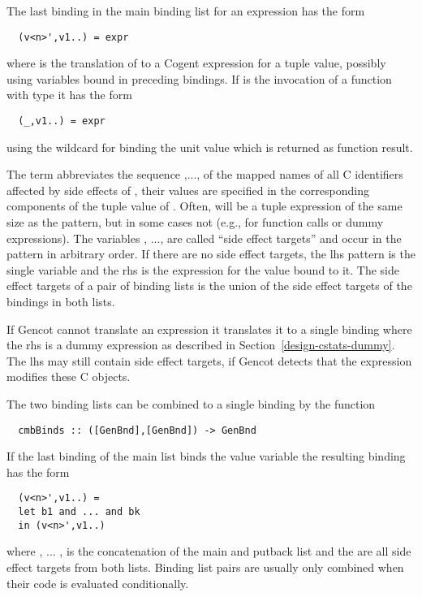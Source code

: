 The last binding in the main binding list for an expression  has the form
\begin{verbatim}
  (v<n>',v1..) = expr
\end{verbatim}
where  is the translation of  to a Cogent expression for a tuple value, possibly using variables bound 
in preceding bindings. If  is the invocation of a function with type  it has the form
\begin{verbatim}
  (_,v1..) = expr
\end{verbatim}
using the wildcard \code{\_} for binding the unit value which is returned as function result.

The term  abbreviates 
the sequence ,..., of the mapped names of all C identifiers affected by side effects of , their values 
are specified in the corresponding components of the tuple value of . Often,  will be a tuple 
expression of the same size as the pattern, but in some cases not (e.g., for function calls or dummy expressions). 
The variables , ...,  are called ``side effect targets'' and occur in the pattern in arbitrary order.
If there are no side effect targets, the lhs pattern is the single variable  and the rhs is the expression for
the value bound to it. The side effect targets of a 
pair of binding lists is the union of the side effect targets of the bindings in both lists.

If Gencot cannot translate an expression it translates it to a single binding where the rhs is a dummy expression as described in 
Section~\ref{design-cstats-dummy}. The lhs may still contain side effect targets, if Gencot detects that the expression
modifies these C objects.

The two binding lists can be combined to a single binding by the function
\begin{verbatim}
  cmbBinds :: ([GenBnd],[GenBnd]) -> GenBnd
\end{verbatim}
If the last binding of the main list binds the value variable  the resulting binding has the form
\begin{verbatim}
  (v<n>',v1..) = 
  let b1 and ... and bk
  in (v<n>',v1..)
\end{verbatim}
where , ... ,  is the concatenation of the main and putback list and the  are all side
effect targets from both lists. Binding list pairs are usually only combined when their code is evaluated conditionally.

